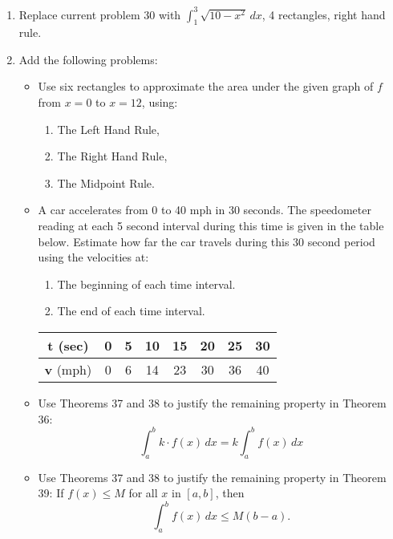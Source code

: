 \documentclass[11pt]{report}
\begin{document}
\begin{enumerate}
\item Replace current problem 30 with $\displaystyle\int_1^3 \sqrt{10-x^2}\,dx$, 4 rectangles, right hand rule. 

\item Add the following problems:

\begin{itemize}
\item Use six rectangles to approximate the area under the given graph of $f$ from $x=0$ to $x=12$, using:
\begin{enumerate}
\item The Left Hand Rule,
\item The Right Hand Rule,
\item The Midpoint Rule.
\end{enumerate}

\item A car accelerates from 0 to 40 mph in 30 seconds. The speedometer reading at each 5 second interval during this time is given in the table below. Estimate how far the car travels during this 30 second period using the velocities at:
\begin{enumerate}
\item The beginning of each time interval.
\item The end of each time interval.
\end{enumerate}

\begin{center}
\begin{tabular} {|c|c|c|c|c|c|c|c|}
\hline
{\bfseries t} (sec)&0&5&10&15&20&25&30\\
\hline
{\bfseries v} (mph)&0&6&14&23&30&36&40\\
\hline
\end{tabular}
\end{center}

\item Use Theorems 37 and 38 to justify the remaining property in Theorem 36: \[\int_a^b k\cdot f(x)\,dx =k\int_a^b f(x)\,dx\]

\item Use Theorems 37 and 38 to justify the remaining property in Theorem 39: If $f(x)\leq M$ for all $x$ in $[a,b]$, then \[\int_a^b f(x)\,dx\leq M(b-a).\]

\end{itemize}

\end{enumerate}
\end{document}

